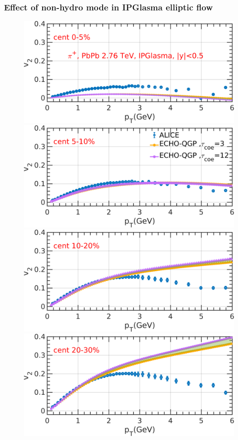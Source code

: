 \documentclass[aspectratio=1610]{beamer}
\begin{document}
\begin{frame}

\frametitle{Effect of non-hydro mode in IPGlasma elliptic flow}

\begin{figure}
\includegraphics[scale=0.19]{figs/IPGlasma/v2_pT0-5.png}
\includegraphics[scale=0.19]{figs/IPGlasma/v2_pT5-10.png}
\includegraphics[scale=0.19]{figs/IPGlasma/v2_pT10-20.png}
\includegraphics[scale=0.19]{figs/IPGlasma/v2_pT20-30.png}

\end{figure}
\end{frame}
\end{document}
